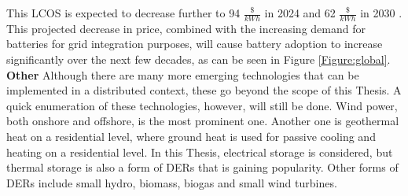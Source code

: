 \newline 
This LCOS is expected to decrease further to 94 $\frac{\$}{kWh}$ in 2024 and 62 $\frac{\$}{kWh}$ in 2030 \cite{bloomberg}. This projected decrease in price, combined with the increasing demand for batteries for grid integration purposes, will cause battery adoption to increase significantly over the next few decades, as can be seen in Figure \ref{Figure:global}.
\newline \newline \noindent
\textbf{Other}
\newline \newline \noindent
Although there are many more emerging technologies that can be implemented in a distributed context, these go beyond the scope of this Thesis. A quick enumeration of these technologies, however, will still be done. Wind power, both onshore and offshore, is the most prominent one. Another one is geothermal heat on a residential level, where ground heat is used for passive cooling and heating on a residential level. In this Thesis, electrical storage is considered, but thermal storage is also a form of DERs that is gaining popularity. Other forms of DERs include small hydro, biomass, biogas and small wind turbines.

